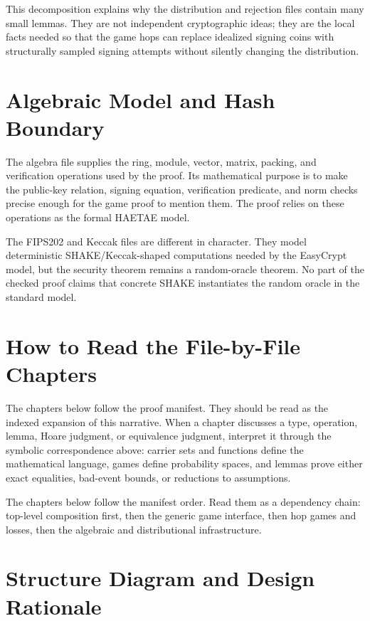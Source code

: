 \documentclass[11pt]{report}
\theoremstyle{definition}
\theoremstyle{plain}
\theoremstyle{definition}
\begin{document}
This decomposition explains why the distribution and rejection files contain
many small lemmas.  They are not independent cryptographic ideas; they are the
local facts needed so that the game hops can replace idealized signing coins
with structurally sampled signing attempts without silently changing the
distribution.

\section*{Algebraic Model and Hash Boundary}

The algebra file supplies the ring, module, vector, matrix, packing, and
verification operations used by the proof.  Its mathematical purpose is to make
the public-key relation, signing equation, verification predicate, and norm
checks precise enough for the game proof to mention them.  The proof relies on
these operations as the formal HAETAE model.

The FIPS202 and Keccak files are different in character.  They model
deterministic SHAKE/Keccak-shaped computations needed by the EasyCrypt model,
but the security theorem remains a random-oracle theorem.  No part of the
checked proof claims that concrete SHAKE instantiates the random oracle in the
standard model.

\section*{How to Read the File-by-File Chapters}

The chapters below follow the proof manifest.  They should be read as the
indexed expansion of this narrative.  When a chapter discusses a type,
operation, lemma, Hoare judgment, or equivalence judgment, interpret it through
the symbolic correspondence above: carrier sets and functions define the
mathematical language, games define probability spaces, and lemmas prove either
exact equalities, bad-event bounds, or reductions to assumptions.

The chapters below follow the manifest order.  Read them as a dependency chain:
top-level composition first, then the generic game interface, then hop games
and losses, then the algebraic and distributional infrastructure.

\section*{Structure Diagram and Design Rationale}
\end{document}
